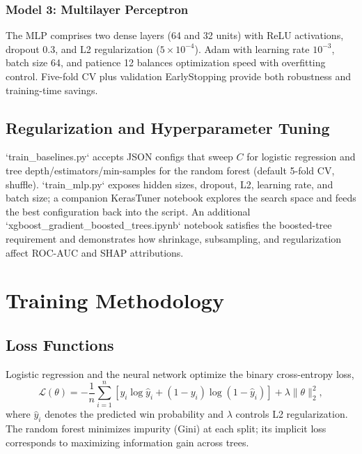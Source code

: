 \documentclass[aps,prl,preprint,groupedaddress]{revtex4-2}
\begin{document}
\subsubsection{Model 3: Multilayer Perceptron}
The MLP comprises two dense layers (64 and 32 units) with ReLU activations, dropout 0.3, and L2 regularization ($5\times10^{-4}$). Adam with learning rate $10^{-3}$, batch size 64, and patience 12 balances optimization speed with overfitting control. Five-fold CV plus validation EarlyStopping provide both robustness and training-time savings.

\subsection{Regularization and Hyperparameter Tuning}
`train_baselines.py` accepts JSON configs that sweep $C$ for logistic regression and tree depth/estimators/min-samples for the random forest (default 5-fold CV, shuffle). `train_mlp.py` exposes hidden sizes, dropout, L2, learning rate, and batch size; a companion KerasTuner notebook explores the search space and feeds the best configuration back into the script. An additional `xgboost_gradient_boosted_trees.ipynb` notebook satisfies the boosted-tree requirement and demonstrates how shrinkage, subsampling, and regularization affect ROC-AUC and SHAP attributions.

\section{Training Methodology}
\label{sec:training}

\subsection{Loss Functions}
Logistic regression and the neural network optimize the binary cross-entropy loss,
\begin{equation}
\mathcal{L}(\theta) = -\frac{1}{n}\sum_{i=1}^{n} \left[y_i \log \hat{y}_i + (1 - y_i) \log (1 - \hat{y}_i)\right] + \lambda \|\theta\|_2^2,
\end{equation}
where $\hat{y}_i$ denotes the predicted win probability and $\lambda$ controls L2 regularization. The random forest minimizes impurity (Gini) at each split; its implicit loss corresponds to maximizing information gain across trees.
\end{document}
